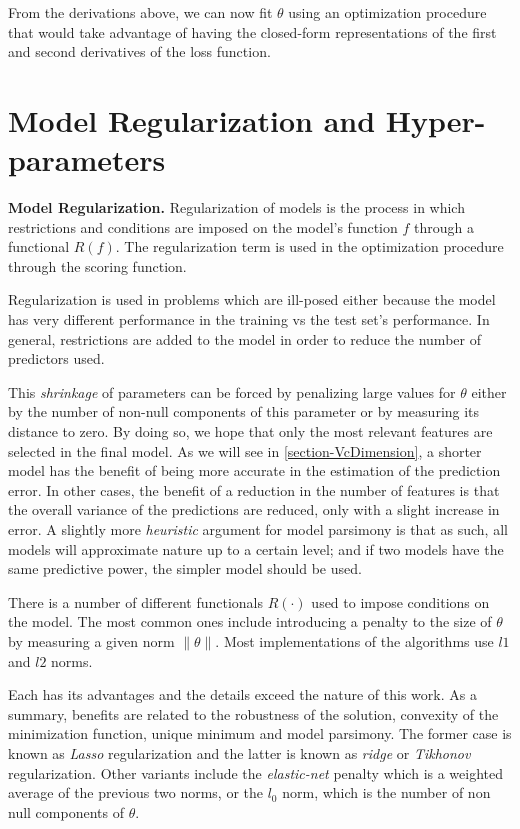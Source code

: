 From the derivations above, we can now fit $\theta$ using an optimization procedure that would take advantage of having the closed-form representations of the first and second derivatives of the loss function.


\section{Model Regularization and Hyper-parameters}\label{section-hyperParametersRegularization}


\begin{definition}\textbf{Model Regularization.}
Regularization of models is the process in which restrictions and conditions are imposed on the model's function $f$ through a functional $ R(f)$.
The regularization term is used in the optimization procedure through the scoring function.
\end{definition}

Regularization is used in problems which are ill-posed either because the model has very different performance in the training vs the test set's performance.
In general, restrictions are added to the model in order to reduce the number of predictors used.

This \textit{shrinkage} of parameters can be forced by penalizing large values for $\theta$ either by the number of non-null components of this parameter or by measuring its distance to zero.
By doing so, we hope that only the most relevant features are selected in the final model.
As we will see in \cref{section-VcDimension}, a shorter model has the benefit of being more accurate in the estimation of the prediction error.
In other cases, the benefit of a reduction in the number of features is that the overall variance of the predictions are reduced, only with a slight increase in error.
A slightly more \textit{heuristic} argument for model parsimony is that as such, all models will approximate nature up to a certain level; and if two models have the same predictive power, the simpler model should be used.


There is a number of different functionals $R(\cdot)$ used to impose conditions on the model.
The most common ones include introducing a penalty to the size of $\theta$ by measuring a given norm $\| \theta \|$.
Most implementations of the algorithms use $l1$ and $l2$ norms.

Each has its advantages and the details exceed the nature of this work.
As a summary, benefits are related to the robustness of the solution, convexity of the minimization function, unique minimum and model parsimony.
The former case is known as \textit{ Lasso} regularization and the latter is known as \textit{ridge} or \textit{Tikhonov} regularization.
Other variants include the \textit{elastic-net} penalty which is a weighted average of the previous two norms, or the $l_0$ norm, which is the number of non null components of $\theta$.

